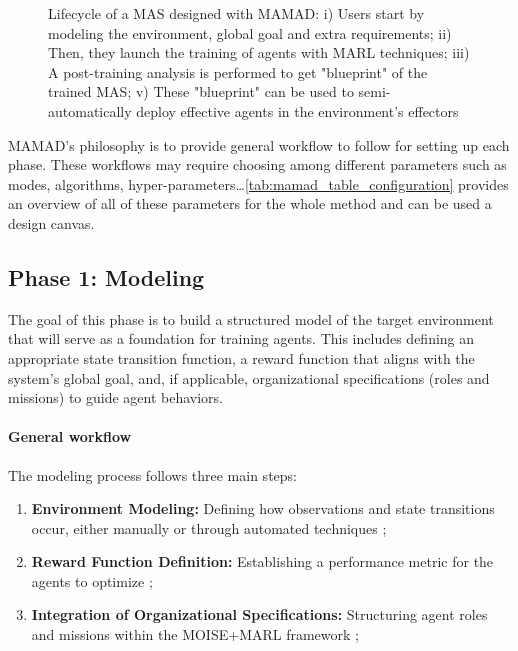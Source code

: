 \documentclass[pdflatex,sn-mathphys-num]{sn-jnl}%
\theoremstyle{thmstyleone}%
\theoremstyle{thmstyletwo}%
\theoremstyle{thmstylethree}%
\begin{document}


\begin{figure}[h!]
  \centering
  
  \caption{Lifecycle of a MAS designed with MAMAD: i) Users start by modeling the environment, global goal and extra requirements; \quad ii) Then, they launch the training of agents with MARL techniques; \quad iii) A post-training analysis is performed to get "blueprint" of the trained MAS; \quad v) These "blueprint" can be used to semi-automatically deploy effective agents in the environment's effectors}
  \label{fig:cycle}
\end{figure}

MAMAD's philosophy is to provide general workflow to follow for setting up each phase. These workflows may require choosing among different parameters such as modes, algorithms, hyper-parameters\dots \autoref{tab:mamad_table_configuration} provides an overview of all of these parameters for the whole method and can be used a design canvas.



\subsection{Phase 1: Modeling}

The goal of this phase is to build a structured model of the target environment that will serve as a foundation for training agents. This includes defining an appropriate state transition function, a reward function that aligns with the system's global goal, and, if applicable, organizational specifications (roles and missions) to guide agent behaviors.

\paragraph{\textbf{General workflow}}
The modeling process follows three main steps:
\begin{enumerate}
    \item \textbf{Environment Modeling:} Defining how observations and state transitions occur, either manually or through automated techniques ;
    \item \textbf{Reward Function Definition:} Establishing a performance metric for the agents to optimize ;
    \item \textbf{Integration of Organizational Specifications:} Structuring agent roles and missions within the MOISE+MARL framework ;
\end{enumerate}
\end{document}
